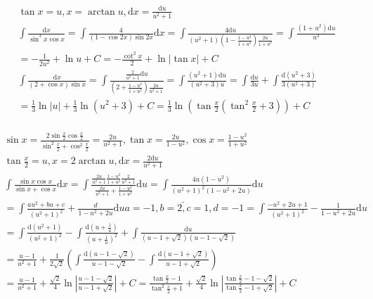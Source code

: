 \documentclass{article}
\begin{document}
\begin{align*}
    \tan x = u ,x =\arctan u , \mathrm{d}x = \frac{\mathrm{d}u}{u^2+1} \\
    \int \frac{\mathrm{d}x}{\sin^3 x \cos x} = \int \frac{4}{(1-\cos 2x)\sin 2x} \mathrm{d}x = \int \frac{4\mathrm{d}u}{(u^2+1)(1-\frac{1-u^2}{1+u^2})\frac{2u}{1+u^2}} = \int \frac{(1+u^2)\mathrm{d}u}{u^3} \\ 
    = -\frac{1}{2u^2} + \ln u + C = -\frac{\cot^2 x}{2} + \ln |\tan x| + C\\
    \int \frac{\mathrm{d}x }{(2+\cos x)\sin x} = \int \frac{\frac{2}{u^2+1} \mathrm{d}u}{(2+\frac{1-u^2}{1+u^2})\frac{2u}{u^2+1}} = \int \frac{(u^2+1)\mathrm{d}u}{(u^2+3)u} = \int \frac{\mathrm{d}u}{3u} + \int \frac{\mathrm{d}(u^2+3)}{3(u^2+3)} \\ 
    = \frac{1}{3}\ln |u| + \frac{1}{3}\ln (u^2+3) + C = \frac{1}{3}\ln\left(\tan \frac{x}{2}(\tan^2 \frac{x}{2}+3)\right) + C \\ 
\end{align*}

\clearpage
\begin{align*}
    \sin x = \frac{2\sin \frac{x}{2}\cos \frac{x}{2}}{\sin^2 \frac{x}{2} + \cos^2 \frac{x}{2}} = \frac{2u}{u^2 + 1} ,\tan x = \frac{2 u}{1 - u^2 } , \cos x = \frac{1 - u^2 }{1 + u^2 } \\
    \tan \frac{x}{2} = u , x = 2\arctan u ,\mathrm{d}x = \frac{2\mathrm{d}u}{u^2+1}\\
    \int \frac{\sin x\cos x}{\sin x + \cos x} \mathrm{d}x = \int \frac{\frac{2u}{u^2+1}\frac{1-u^2}{1+u^2}\frac{2}{u^2+1}}{\frac{2u}{u^2+1}+\frac{1-u^2}{1+u^2}}\mathrm{d}u = \int \frac{4u(1-u^2)}{(u^2+1)^2(1-u^2+2u)} \mathrm{d}u \\
    = \int \frac{au^2+bu+c }{(u^2+1)^2} + \frac{d}{1-u^2+2u} \mathrm{d} u  \underrightarrow{a = -1 ,b = 2,c= 1,d=-1 }= \int \frac{-u^2+2u+1 }{(u^2+1)^2} - \frac{1}{1-u^2+2u} \mathrm{d} u \\
    = \int \frac{\mathrm{d}(u^2+1)}{(u^2+1)^2} - \int \frac{\mathrm{d}\left(u+\frac{1}{u}\right)}{(u+\frac{1}{u})^2} + \int \frac{\mathrm{d} u}{(u-1+\sqrt{2})(u-1-\sqrt{2})} \\ 
    = \frac{u-1}{u^2+1} + \frac{1}{2\sqrt{2}}\left(\int \frac{\mathrm{d}(u-1-\sqrt{2})}{u-1-\sqrt{2}} - \int \frac{\mathrm{d}(u-1+\sqrt{2})}{u-1+\sqrt{2}}\right)\\
    = \frac{u-1}{u^2+1} + \frac{\sqrt{2}}{4}\ln\left|\frac{u-1-\sqrt{2}}{u-1+\sqrt{2}}\right|+ C = \frac{\tan \frac{x}{2}-1}{\tan^2 \frac{x}{2}+1} + \frac{\sqrt{2}}{4}\ln\left|\frac{\tan \frac{x}{2}-1-\sqrt{2}}{\tan \frac{x}{2} - 1+\sqrt{2}}\right|+ C \\
\end{align*}
\end{document}
